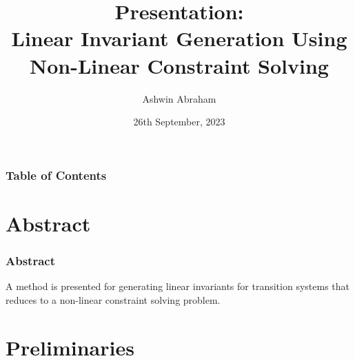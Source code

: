 \documentclass{beamer}
\title[] 
{Presentation:\\Linear Invariant Generation Using Non-Linear Constraint Solving}
\author[Ashwin Abraham] 
{Ashwin Abraham}
\institute[IIT-B] 
{
    IIT Bombay
}
\date[2023]
{26th September, 2023}
\begin{document}
    \frame{\titlepage}

    \begin{frame}
        \frametitle{Table of Contents}
        \tableofcontents    
    \end{frame}

    \section{Abstract}
    {
        \begin{frame}
            \frametitle{Abstract}
            A method is presented for generating linear invariants for transition systems that reduces to a non-linear constraint solving problem. 
        \end{frame}
    }

    \section{Preliminaries}
\end{document}
